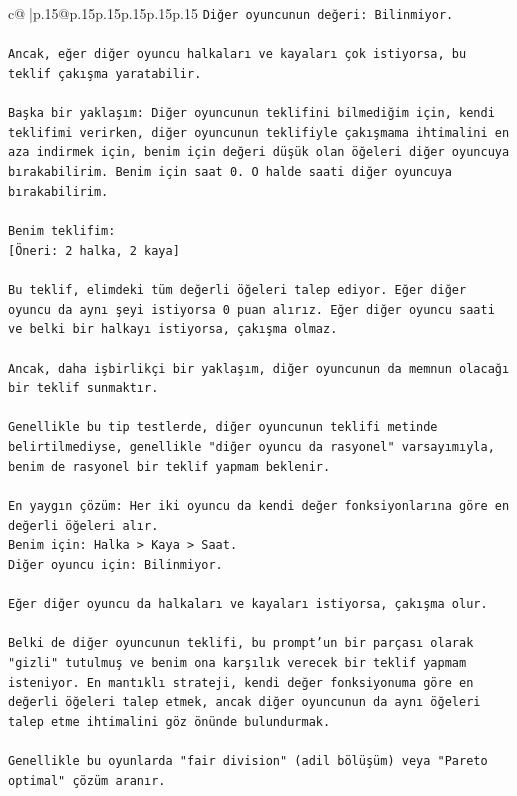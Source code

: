 \documentclass{article}
\begin{document}
{\begin{supertabular}{c@{$\;$}|p{.15\linewidth}@{}p{.15\linewidth}p{.15\linewidth}p{.15\linewidth}p{.15\linewidth}p{.15\linewidth}}
{{{\texttt{Diğer oyuncunun değeri: Bilinmiyor.} \\
\\ 
\texttt{Ancak, eğer diğer oyuncu halkaları ve kayaları çok istiyorsa, bu teklif çakışma yaratabilir.} \\
\\ 
\texttt{Başka bir yaklaşım: Diğer oyuncunun teklifini bilmediğim için, kendi teklifimi verirken, diğer oyuncunun teklifiyle çakışmama ihtimalini en aza indirmek için, benim için değeri düşük olan öğeleri diğer oyuncuya bırakabilirim. Benim için saat 0. O halde saati diğer oyuncuya bırakabilirim.} \\
\\ 
\texttt{Benim teklifim:} \\
\texttt{{[}Öneri: 2 halka, 2 kaya{]}} \\
\\ 
\texttt{Bu teklif, elimdeki tüm değerli öğeleri talep ediyor. Eğer diğer oyuncu da aynı şeyi istiyorsa 0 puan alırız. Eğer diğer oyuncu saati ve belki bir halkayı istiyorsa, çakışma olmaz.} \\
\\ 
\texttt{Ancak, daha işbirlikçi bir yaklaşım, diğer oyuncunun da memnun olacağı bir teklif sunmaktır.} \\
\\ 
\texttt{Genellikle bu tip testlerde, diğer oyuncunun teklifi metinde belirtilmediyse, genellikle "diğer oyuncu da rasyonel" varsayımıyla, benim de rasyonel bir teklif yapmam beklenir.} \\
\\ 
\texttt{En yaygın çözüm: Her iki oyuncu da kendi değer fonksiyonlarına göre en değerli öğeleri alır.} \\
\texttt{Benim için: Halka > Kaya > Saat.} \\
\texttt{Diğer oyuncu için: Bilinmiyor.} \\
\\ 
\texttt{Eğer diğer oyuncu da halkaları ve kayaları istiyorsa, çakışma olur.} \\
\\ 
\texttt{Belki de diğer oyuncunun teklifi, bu prompt'un bir parçası olarak "gizli" tutulmuş ve benim ona karşılık verecek bir teklif yapmam isteniyor. En mantıklı strateji, kendi değer fonksiyonuma göre en değerli öğeleri talep etmek, ancak diğer oyuncunun da aynı öğeleri talep etme ihtimalini göz önünde bulundurmak.} \\
\\ 
\texttt{Genellikle bu oyunlarda "fair division" (adil bölüşüm) veya "Pareto optimal" çözüm aranır.} \\
}}}
\end{supertabular}}
\end{document}

